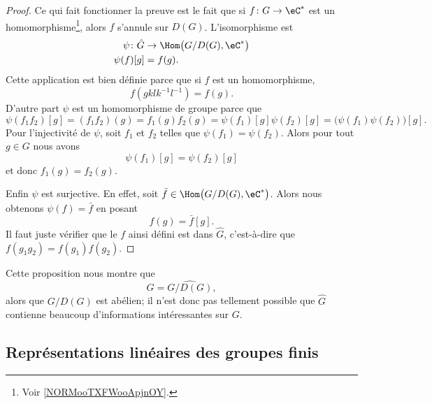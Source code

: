 \begin{proof}
	Ce qui fait fonctionner la preuve est le fait que si \( f\colon G\to \eC^*\) est un homomorphisme\footnote{Voir \ref{NORMooTXFWooApjnOY}.}, alors \( f\) s'annule sur \( D(G)\). L'isomorphisme est
	\begin{equation}
		\begin{aligned}
			\psi\colon \hat G & \to \Hom\big( G/D(G),\eC^* \big) \\
			\psi(f)[g]        & =f(g).
		\end{aligned}
	\end{equation}
	Cette application est bien définie parce que si \( f\) est un homomorphisme,
	\begin{equation}
		f(gklk^{-1}l^{-1})=f(g).
	\end{equation}
	D'autre part \( \psi\) est un homomorphisme de groupe parce que
	\begin{equation}
		\psi(f_1f_2)[g]=(f_1f_2)(g)=f_1(g)f_2(g)=\psi(f_1)[g]\psi(f_2)[g]=\big( \psi(f_1)\psi(f_2) \big)[g].
	\end{equation}
	Pour l'injectivité de \( \psi\), soit \( f_1\) et \( f_2\) telles que \( \psi(f_1)=\psi(f_2)\). Alors pour tout \( g\in G\) nous avons
	\begin{equation}
		\psi(f_1)[g]=\psi(f_2)[g]
	\end{equation}
	et donc \( f_1(g)=f_2(g)\).

	Enfin \( \psi\) est surjective. En effet, soit \( \bar f\in\Hom\big( G/D(G),\eC^* \big)\). Alors nous obtenons \( \psi(f)=\bar f\) en posant
	\begin{equation}
		f(g)=\bar f[g].
	\end{equation}
	Il faut juste vérifier que le \( f\) ainsi défini est dans \( \hat G\), c'est-à-dire que \( f(g_1g_2)=f(g_1)f(g_2)\).
\end{proof}

Cette proposition nous montre que
\begin{equation}
	\hat G=\widehat{G/D(G)},
\end{equation}
alors que \( G/D(G)\) est abélien; il n'est donc pas tellement possible que \( \hat G\) contienne beaucoup d'informations intéressantes sur \( G\).

\subsection{Représentations linéaires des groupes finis}

